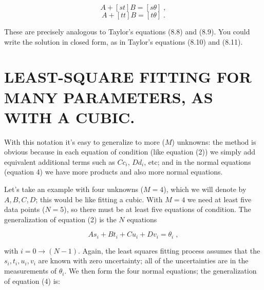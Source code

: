 \begin{mathletters}
\begin{equation}
[ss]A + [st]B = [s\theta] \; ,
\end{equation}
\begin{equation}
[ts]A + [tt]B = [t\theta] \; .
\end{equation}
\end{mathletters}

\noindent These are precisely analogous to Taylor's equations (8.8) and
(8.9).  You could write the solution in closed form, as in Taylor's
equations (8.10) and (8.11).  

\section{LEAST-SQUARE FITTING FOR MANY PARAMETERS, AS WITH A CUBIC.}

	With this notation it's easy to generalize to more ($M$)
unknowns: the method is obvious because in each equation of condition
(like equation (2)) we simply add equivalent additional terms such as $C
c_i$, $D d_i$, etc; and in the normal equations (equation 4) we have
more products and also more normal equations. 

	Let's take an example with four unknowns ($M=4$), which we will
denote by $A, B, C, D$; this would be like fitting a cubic.  With $M=4$
we need at least five data points ($N=5$), so there must be at least
five equations of condition.  The generalization of equation (2) is the
$N$ equations

\begin{equation}
\label{eqcond}
A s_i + B t_i + C u_i + D v_i = \theta_i \; ,
\end{equation}

\noindent with $i = 0 \rightarrow (N-1)$.  Again, the least squares
fitting process assumes that the $s_i, t_i, u_i, v_i$ are known with
zero uncertainty; all of the uncertainties are in the measurements of
$\theta_i$.  We then form the four normal equations; the generalization
of equation (4) is:

